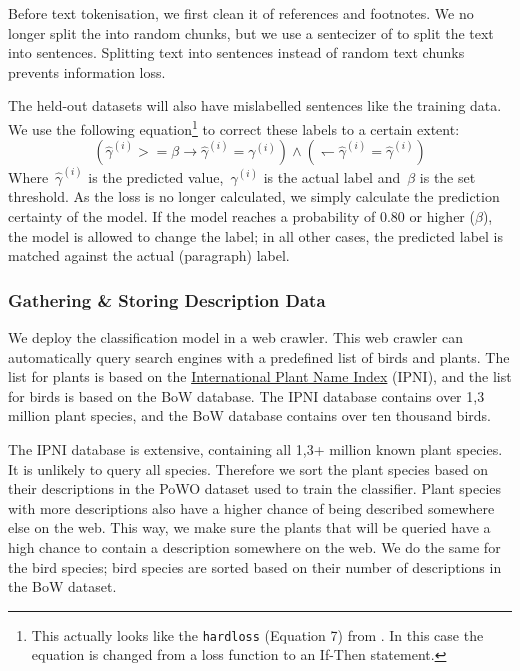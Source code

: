 \documentclass[a4paper, 12pt, oneside]{book} %
\begin{document}
Before text tokenisation, we first clean it of references and footnotes.
We no longer split the into random chunks, but we use a sentecizer of \textcite{honnibal_spacy_2020} to split the text into sentences.
Splitting text into sentences instead of random text chunks prevents information loss.

The held-out datasets will also have mislabelled sentences like the training data.
We use the following equation\footnote{This actually looks like the \texttt{hardloss} (Equation 7) from \textcite{reed_training_2015}. In this case the equation is changed from a loss function to an If-Then statement.} to correct these labels to a certain extent:
\begin{equation} \label{eq:softloss_ifthen}
(\hat{\gamma}^{(i)} >= \beta \rightarrow \hat{\gamma}^{(i)} = \gamma^{(i)}) \wedge ( \leftharpoondown \hat{\gamma}^{(i)} = \hat{\gamma}^{(i)})
\end{equation}
Where~$\hat{\gamma}^{(i)}$ is the predicted value,~$\gamma^{(i)}$ is the actual label and~$\beta$ is the set threshold. 
As the loss is no longer calculated, we simply calculate the prediction certainty of the model.
If the model reaches a probability of 0.80 or higher (\(\beta\)), the model is allowed to change the label; in all other cases, the predicted label is matched against the actual (paragraph) label.


\subsubsection{Gathering \& Storing Description Data}
We deploy the classification model in a web crawler.
This web crawler can automatically query search engines with a predefined list of birds and plants.
The list for plants is based on the \href{https://www.ipni.org/}{International Plant Name Index} (IPNI), and the list for birds is based on the BoW database. %
The IPNI database contains over 1,3 million plant species, and the BoW database contains over ten thousand birds.

The IPNI database is extensive, containing all 1,3+ million known plant species.
It is unlikely to query all species. 
Therefore we sort the plant species based on their descriptions in the PoWO dataset used to train the classifier.
Plant species with more descriptions also have a higher chance of being described somewhere else on the web.
This way, we make sure the plants that will be queried have a high chance to contain a description somewhere on the web.
We do the same for the bird species; bird species are sorted based on their number of descriptions in the BoW dataset.
\end{document}
